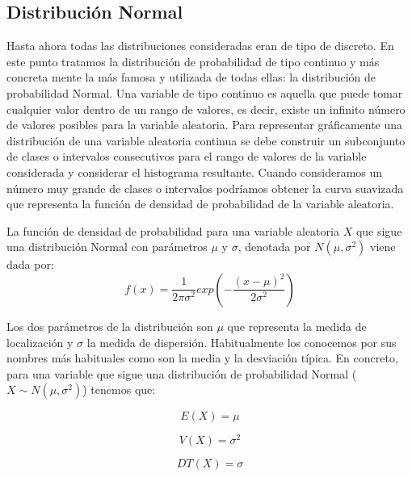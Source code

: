 \documentclass[
]{book}
\begin{document}
\hypertarget{prob-normal}{%
\subsection{Distribución Normal}\label{prob-normal}}

Hasta ahora todas las distribuciones consideradas eran de tipo de discreto. En este punto tratamos la distribución de probabilidad de tipo continuo y más concreta mente la más famosa y utilizada de todas ellas: la distribución de probabilidad Normal. Una variable de tipo continuo es aquella que puede tomar cualquier valor dentro de un rango de valores, es decir, existe un infinito número de valores posibles para la variable aleatoria. Para representar gráficamente una distribución de una variable aleatoria continua se debe construir un subconjunto de clases o intervalos consecutivos para el rango de valores de la variable considerada y considerar el histograma resultante. Cuando consideramos un número muy grande de clases o intervalos podríamos obtener la curva suavizada que representa la función de densidad de probabilidad de la variable aleatoria.

La función de densidad de probabilidad para una variable aleatoria \(X\) que sigue una distribución Normal con parámetros \(\mu\) y \(\sigma\), denotada por \(N(\mu, \sigma^2)\) viene dada por:
\begin{equation} 
  f(x) = \frac{1}{2\pi\sigma^2} exp\left(-\frac{(x - \mu)^2}{2\sigma^2}\right)
  \label{eq:densinormal}
\end{equation}

Los dos parámetros de la distribución son \(\mu\) que representa la medida de localización y \(\sigma\) la medida de dispersión. Habitualmente los conocemos por sus nombres más habituales como son la media y la desviación típica. En concreto, para una variable que sigue una distribución de probabilidad Normal (\(X \sim N(\mu, \sigma^2)\)) tenemos que:

\begin{equation} 
  E(X) = \mu
  \label{eq:meannormal}
\end{equation}

\begin{equation} 
  V(X) = \sigma^2
  \label{eq:varnormal}
\end{equation}

\begin{equation} 
  DT(X) = \sigma
  \label{eq:sdnormal}
\end{equation}
\end{document}
